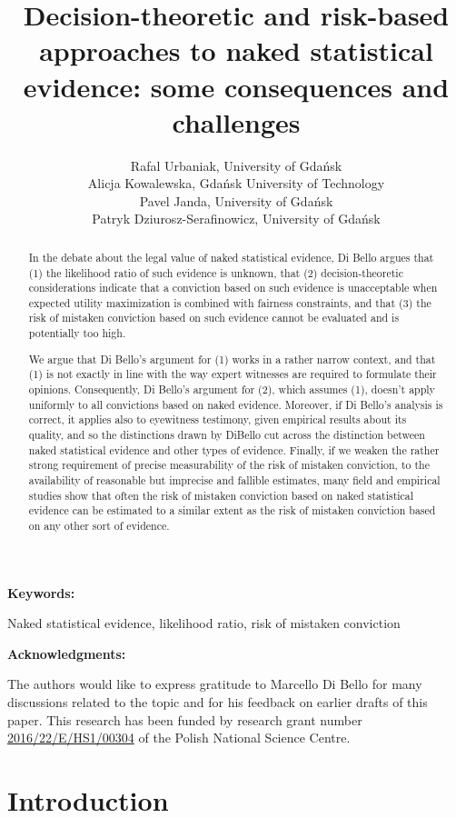 \documentclass{article}
\title{Decision-theoretic and risk-based approaches to  naked statistical evidence: some consequences and challenges}
\author{Rafal Urbaniak, University of Gda\'nsk\\
Alicja Kowalewska,  Gda\' nsk University of Technology\\
Pavel Janda, University of Gda\' nsk \\
Patryk Dziurosz-Serafinowicz, University of Gda\' nsk}
\date{}
\begin{document}
\maketitle


\begin{abstract}

In the debate about the legal value of naked statistical evidence, Di Bello argues that (1) the likelihood ratio of such evidence is unknown, that (2) decision-theoretic considerations indicate that a conviction  based on such evidence  is unacceptable when  expected utility maximization is combined with fairness constraints, and that (3)  the risk of mistaken conviction based on such evidence cannot be evaluated and is  potentially too high.

We argue that Di Bello's argument for (1) works in a rather narrow context, and that (1) is not exactly in line with the way expert witnesses are required to formulate their opinions. Consequently, Di Bello's argument for (2), which assumes (1), doesn't apply uniformly to all convictions based on naked evidence. Moreover, if Di Bello's analysis is correct, it applies also to eyewitness testimony, given empirical results about its quality, and so the distinctions drawn by DiBello cut across the distinction  between naked statistical evidence and other types of evidence.  Finally, if  we weaken the rather strong requirement of precise measurability  of the risk of mistaken conviction, to the availability of reasonable but imprecise and fallible estimates,  many field and empirical studies show that often the risk of mistaken conviction based on naked statistical evidence can be estimated to a similar extent as the risk of mistaken conviction based on any  other sort of evidence. 
\end{abstract}

\noindent \textbf{Keywords:} 

Naked statistical evidence, likelihood ratio, risk of mistaken conviction


\noindent \textbf{Acknowledgments:}

 The authors would like to express gratitude to Marcello Di Bello for many discussions related to the topic and for his feedback on earlier drafts of this paper. This research has been funded by research grant number \url{2016/22/E/HS1/00304} of the Polish National Science Centre. 



\section{Introduction}
\end{document}
